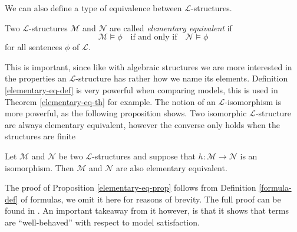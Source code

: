 \documentclass[../../main.tex]{subfiles}
\begin{document}
% 
% 

We can also define a type of equivalence between $\mathcal{L}$-structures.

\begin{definition}\label{elementary-eq-def}\cite[Definition 1.1.9]{Mar02}
    Two $\mathcal{L}$-structures $\mathcal{M}$ and $\mathcal{N}$ are called \emph{elementary equivalent} if
    $$\mathcal{M} \models \phi \quad \text{if and only if} \quad \mathcal{N} \models \phi$$
    for all sentences $\phi$ of $\mathcal{L}$.
\end{definition}

This is important, since like with algebraic structures we are more interested in the properties an $\mathcal{L}$-structure has rather how we name its elements.
Definition \ref{elementary-eq-def} is very powerful when comparing models, this is used in Theorem \ref{elementary-eq-th} for example.
The notion of an $\mathcal{L}$-isomorphism is more powerful, as the following proposition shows.
Two isomorphic $\mathcal{L}$-structure are always elementary equivalent, however the converse only holds when the structures are finite \cite[Proposition 1.3.19]{Cha90}

\begin{proposition}\label{elementary-eq-prop}\cite[Theorem 1.1.10]{Mar02}
    Let $\mathcal{M}$ and $\mathcal{N}$ be two $\mathcal{L}$-structures and suppose that $h: \mathcal{M} \to \mathcal{N}$ is an isomorphism.
    Then $\mathcal{M}$ and $\mathcal{N}$ are also elementary equivalent.
\end{proposition}
The proof of Proposition \ref{elementary-eq-prop} follows from Definition \ref{formula-def} of formulas, we omit it here for reasons of brevity.
The full proof can be found in \cite{Mar02}.
An important takeaway from it however, is that it shows that terms are ``well-behaved'' with respect to model satisfaction.
\end{document}
